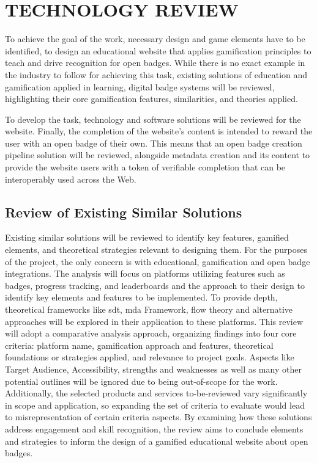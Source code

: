 \section{TECHNOLOGY REVIEW}

To achieve the goal of the work, necessary design and game elements have to be identified, to design an educational website that applies gamification principles to teach and drive recognition for open badges. 
While there is no exact example in the industry to follow for achieving this task, existing solutions of education and gamification applied in learning, digital badge systems will be reviewed, highlighting their core gamification features, similarities, and theories applied.

To develop the task, technology and software solutions will be reviewed for the website. 
Finally, the completion of the website's content is intended to reward the user with an open badge of their own. 
This means that an open badge creation pipeline solution will be reviewed, alongside metadata creation and its content to provide the website users with a token of verifiable completion that can be interoperably used across the Web.

\subsection{Review of Existing Similar Solutions}
Existing similar solutions will be reviewed to identify key features, gamified elements, and theoretical strategies relevant to designing them. For the purposes of the project, the only concern is with educational, gamification and open badge integrations. 
The analysis will focus on platforms utilizing features such as badges, progress tracking, and leaderboards and the approach to their design to identify key elements and features to be implemented. 
To provide depth, theoretical frameworks like \acrshort{sdt}, \acrshort{mda} Framework, flow theory and alternative approaches will be explored in their application to these platforms. 
This review will adopt a comparative analysis approach, organizing findings into four core criteria: platform name, gamification approach and features, theoretical foundations or strategies applied, and relevance to project goals. 
Aspects like Target Audience, Accessibility, strengths and weaknesses as well as many other potential outlines will be ignored due to being out-of-scope for the work.
Additionally, the selected products and services to-be-reviewed vary significantly in scope and application, so expanding the set of criteria to evaluate would lead to misrepresentation of certain criteria aspects.
By examining how these solutions address engagement and skill recognition, the review aims to conclude elements and strategies to inform the design of a gamified educational website about open badges.

